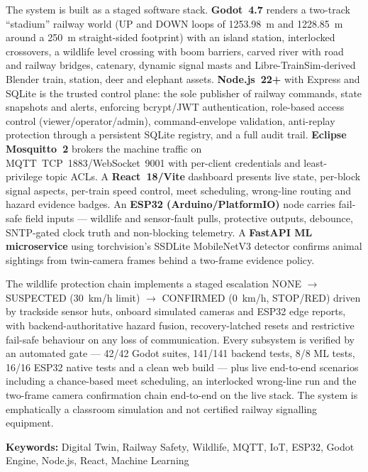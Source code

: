 The system is built as a staged software stack. \textbf{Godot~4.7} renders a
two-track ``stadium'' railway world (UP and DOWN loops of 1253.98~m and
1228.85~m around a 250~m straight-sided footprint) with an island station,
interlocked crossovers, a wildlife level crossing with boom barriers, carved
river with road and railway bridges, catenary, dynamic signal masts and
Libre-TrainSim-derived Blender train, station, deer and
elephant assets. \textbf{Node.js~22+} with Express and SQLite is the trusted
control plane: the sole publisher of railway commands, state snapshots and
alerts, enforcing bcrypt/JWT authentication, role-based access control
(viewer/operator/admin), command-envelope validation, anti-replay protection
through a persistent SQLite registry, and a full audit trail.
\textbf{Eclipse Mosquitto~2} brokers the machine traffic on
MQTT~TCP~1883/WebSocket~9001 with per-client credentials and least-privilege
topic ACLs. A \textbf{React~18/Vite} dashboard presents live state, per-block
signal aspects, per-train speed control, meet scheduling, wrong-line routing
and hazard evidence badges. An \textbf{ESP32 (Arduino/PlatformIO)} node carries
fail-safe field inputs --- wildlife and sensor-fault pulls, protective outputs,
debounce, SNTP-gated clock truth and non-blocking telemetry. A
\textbf{FastAPI ML microservice} using torchvision's SSDLite MobileNetV3
detector confirms animal sightings from twin-camera frames behind a
two-frame evidence policy.

The wildlife protection chain implements a staged escalation
NONE $\rightarrow$ SUSPECTED (30~km/h limit) $\rightarrow$ CONFIRMED
(0~km/h, STOP/RED) driven by trackside sensor huts, onboard simulated
cameras and ESP32 edge reports, with backend-authoritative hazard fusion,
recovery-latched resets and restrictive fail-safe behaviour on any loss of
communication. Every subsystem is verified by an automated gate ---
42/42 Godot suites, 141/141 backend tests, 8/8 ML tests, 16/16 ESP32 native
tests and a clean web build --- plus live end-to-end scenarios including a
chance-based meet scheduling, an interlocked wrong-line run and the
two-frame camera confirmation chain end-to-end on the live stack. The
system is emphatically a classroom simulation and not certified railway
signalling equipment.

\vspace{6pt}
\noindent\textbf{Keywords:} Digital Twin, Railway Safety, Wildlife, MQTT,
IoT, ESP32, Godot Engine, Node.js, React, Machine Learning
\clearpage
\tableofcontents
\clearpage
\listoffigures
\clearpage
\listoftables
\clearpage
%
